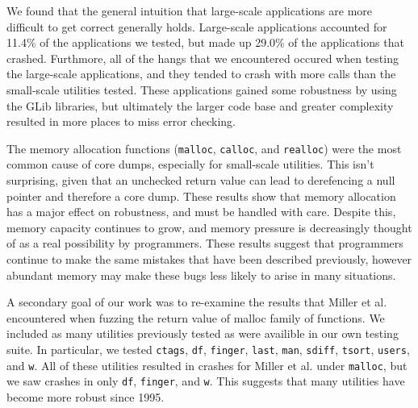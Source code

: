 We found that the general intuition that large-scale applications are more difficult to get correct generally holds. Large-scale applications accounted for 11.4\% of the applications we tested, but made up 29.0\% of the applications that crashed. Furthmore, all of the hangs that we encountered occured when testing the large-scale applications, and they tended to crash with more calls than the small-scale utilities tested. These applications gained some robustness by using the GLib libraries, but ultimately the larger code base and greater complexity resulted in more places to miss error checking.

The memory allocation functions (\texttt{malloc}, \texttt{calloc}, and \texttt{realloc}) were the most common cause of core dumps, especially for small-scale utilities. This isn't surprising, given that an unchecked return value can lead to derefencing a null pointer and therefore a core dump. These results show that memory allocation has a major effect on robustness, and must be handled with care. Despite this, memory capacity continues to grow, and memory pressure is decreasingly thought of as a real possibility by programmers. These results suggest that programmers continue to make the same mistakes that have been described previously, however abundant memory may make these bugs less likely to arise in many situations.

A secondary goal of our work was to re-examine the results that Miller et al. encountered when fuzzing the return value of malloc family of functions. We included as many utilities previously tested as were availible in our own testing suite. In particular, we tested \texttt{ctags}, \texttt{df}, \texttt{finger}, \texttt{last}, \texttt{man}, \texttt{sdiff}, \texttt{tsort}, \texttt{users}, and \texttt{w}. All of these utilities resulted in crashes for Miller et al. under \texttt{malloc}, but we saw crashes in only \texttt{df}, \texttt{finger}, and \texttt{w}. This suggests that many utilities have become more robust since 1995.  
